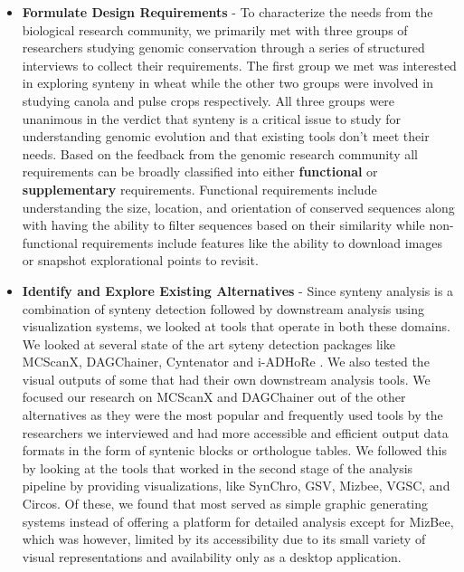 \begin{itemize}
    
    \item \textbf{Formulate Design Requirements} -
    To characterize the needs from the biological research community, we primarily met with three groups of researchers studying genomic conservation through a series of structured interviews to collect their requirements. The first group we met was interested in exploring synteny in wheat while the other two groups were involved in studying canola and pulse crops respectively. All three groups were unanimous in the verdict that synteny is a critical issue to study for understanding genomic evolution and that existing tools don't meet their needs. Based on the feedback from the genomic research community all requirements can be broadly classified into either \textbf{functional} or \textbf{supplementary} requirements. Functional requirements include understanding the size, location, and orientation of conserved sequences along with having the ability to filter sequences based on their similarity while non-functional requirements include features like the ability to download images or snapshot explorational points to revisit.
    
    \item \textbf{Identify and Explore Existing Alternatives} - 
    Since synteny analysis is a combination of synteny detection followed by downstream analysis using visualization systems, we looked at tools that operate in both these domains. We looked at several state of the art syteny detection packages like MCScanX, DAGChainer, Cyntenator and i-ADHoRe \cite{wang2012mcscanx,haas2004dagchainer,rodelsperger2010cyntenator,proost2011adhore}. We also tested the visual outputs of some that had their own downstream analysis tools. We focused our research on MCScanX and DAGChainer out of the other alternatives as they were the most popular and frequently used tools by the researchers we interviewed and had more accessible and  efficient output data formats in the form of syntenic blocks or orthologue tables. We followed this by looking at the tools that worked in the second stage of the analysis pipeline by providing visualizations, like SynChro, GSV, Mizbee, VGSC, and Circos\cite{drillon2014synchro,revanna2011gsv,Meyer2009,xu2016vgsc}. Of these, we found that most served as simple graphic generating systems instead of offering a platform for detailed analysis except for MizBee, which was however, limited by its accessibility due to its small variety of visual representations and availability only as a desktop application.


\end{itemize}
